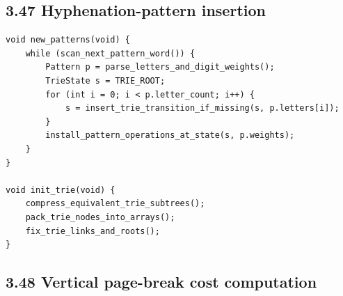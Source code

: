 \documentclass[11pt]{article}
\begin{document}
\subsection{3.47 Hyphenation-pattern
insertion}\label{hyphenation-pattern-insertion}

\begin{verbatim}
void new_patterns(void) {
    while (scan_next_pattern_word()) {
        Pattern p = parse_letters_and_digit_weights();
        TrieState s = TRIE_ROOT;
        for (int i = 0; i < p.letter_count; i++) {
            s = insert_trie_transition_if_missing(s, p.letters[i]);
        }
        install_pattern_operations_at_state(s, p.weights);
    }
}

void init_trie(void) {
    compress_equivalent_trie_subtrees();
    pack_trie_nodes_into_arrays();
    fix_trie_links_and_roots();
}
\end{verbatim}

\subsection{3.48 Vertical page-break cost
computation}\label{vertical-page-break-cost-computation}
\end{document}
